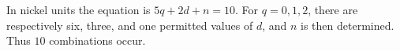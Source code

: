 In nickel units the equation is $ 5q+2d+n=10 $. For $ q=0,1,2 $, there are respectively six, three, and one permitted values of $ d $, and $ n $ is then determined. Thus $\boxed{10}$ combinations occur.

